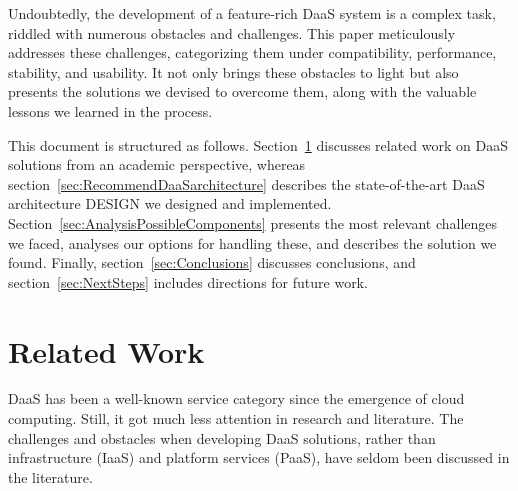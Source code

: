 \documentclass[runningheads]{llncs}
\begin{document}
Undoubtedly, the development of a feature-rich DaaS system is a complex task, riddled with numerous obstacles and challenges. This paper meticulously addresses these challenges, categorizing them under compatibility, performance, stability, and usability. It not only brings these obstacles to light but also presents the solutions we devised to overcome them, along with the valuable lessons we learned in the process.

This document is structured as follows. Section~\ref{sec:relatedworkAbschnitt} discusses related work on DaaS solutions from an academic perspective, whereas section~\ref{sec:RecommendDaaSarchitecture} describes the state-of-the-art DaaS architecture DESIGN we designed and implemented. Section~\ref{sec:AnalysisPossibleComponents} presents the most relevant challenges we faced, analyses our options for handling these, and describes the solution we found. Finally, section~\ref{sec:Conclusions} discusses conclusions, and section~\ref{sec:NextSteps} includes directions for future work.



\section{Related Work}
\label{sec:relatedworkAbschnitt}


DaaS has been a well-known service category since the emergence of cloud computing. Still, it got much less attention in research and literature.
The challenges and obstacles when developing DaaS solutions, rather than infrastructure (IaaS) and platform services (PaaS), have seldom been discussed in the literature.
\end{document}
